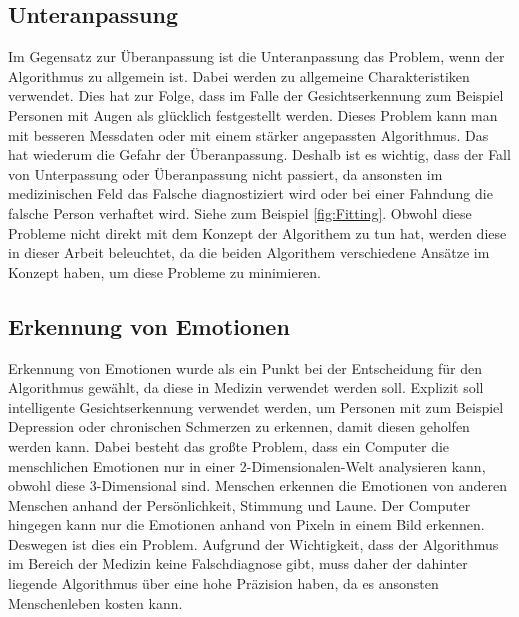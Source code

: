 \subsection{Unteranpassung}
\label{subsec:background:second_section:first_subsection}
Im Gegensatz zur Überanpassung ist die Unteranpassung das Problem, wenn der Algorithmus zu allgemein ist. 
Dabei werden zu allgemeine Charakteristiken verwendet. \cite{Zhi-Hua}
Dies hat zur Folge, dass im Falle der Gesichtserkennung zum Beispiel Personen mit Augen als glücklich festgestellt werden.
Dieses Problem kann man mit besseren Messdaten oder mit einem stärker angepassten Algorithmus.
Das hat wiederum die Gefahr der Überanpassung. 
Deshalb ist es wichtig, dass der Fall von Unterpassung oder Überanpassung nicht passiert, da ansonsten im medizinischen Feld das Falsche diagnostiziert wird oder bei einer Fahndung die falsche Person verhaftet wird.
Siehe zum Beispiel \ref{fig:Fitting}.
Obwohl diese Probleme nicht direkt mit dem Konzept der Algorithem zu tun hat, werden diese in dieser Arbeit beleuchtet, da die beiden Algorithem verschiedene Ansätze im Konzept haben, um diese Probleme zu minimieren.

\subsection{Erkennung von Emotionen}
\label{ssubsec:background:second_section:third_subsection}
Erkennung von Emotionen wurde als ein Punkt bei der Entscheidung für den Algorithmus gewählt, da diese in Medizin verwendet werden soll.
Explizit soll intelligente Gesichtserkennung verwendet werden, um Personen mit zum Beispiel Depression oder chronischen Schmerzen zu erkennen, damit diesen geholfen werden kann. \cite{Emotion2020}
Dabei besteht das großte Problem, dass ein Computer die menschlichen Emotionen nur in einer 2-Dimensionalen-Welt analysieren kann, obwohl diese 3-Dimensional sind.
Menschen erkennen die Emotionen von anderen Menschen anhand der Persönlichkeit, Stimmung und Laune.
Der Computer hingegen kann nur die Emotionen anhand von Pixeln in einem Bild erkennen.
Deswegen ist dies ein Problem. \cite{Emotion2020}
Aufgrund der Wichtigkeit, dass der Algorithmus im Bereich der Medizin keine Falschdiagnose gibt, muss daher der dahinter liegende Algorithmus über eine hohe Präzision haben, da es ansonsten Menschenleben kosten kann.


